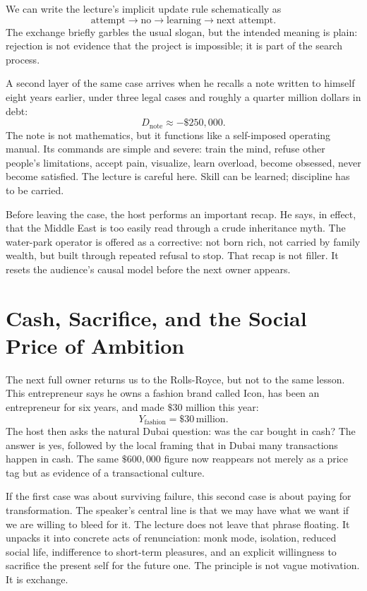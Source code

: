 We can write the lecture's implicit update rule schematically as
\begin{equation}
\text{attempt}\to \text{no}\to \text{learning}\to \text{next attempt}.
\end{equation}
The exchange briefly garbles the usual slogan, but the intended meaning is plain: rejection is not evidence that the project is impossible; it is part of the search process.

A second layer of the same case arrives when he recalls a note written to himself eight years earlier, under three legal cases and roughly a quarter million dollars in debt:
\begin{equation}
D_{\text{note}}\approx -\$250{,}000.
\end{equation}
The note is not mathematics, but it functions like a self-imposed operating manual. Its commands are simple and severe: train the mind, refuse other people's limitations, accept pain, visualize, learn overload, become obsessed, never become satisfied. The lecture is careful here. Skill can be learned; discipline has to be carried.

Before leaving the case, the host performs an important recap. He says, in effect, that the Middle East is too easily read through a crude inheritance myth. The water-park operator is offered as a corrective: not born rich, not carried by family wealth, but built through repeated refusal to stop. That recap is not filler. It resets the audience's causal model before the next owner appears.

\section{Cash, Sacrifice, and the Social Price of Ambition}

The next full owner returns us to the Rolls-Royce, but not to the same lesson. This entrepreneur says he owns a fashion brand called Icon, has been an entrepreneur for six years, and made \(\$30\) million this year:
\begin{equation}
Y_{\text{fashion}}=\$30\,\text{million}.
\end{equation}
The host then asks the natural Dubai question: was the car bought in cash? The answer is yes, followed by the local framing that in Dubai many transactions happen in cash. The same \(\$600{,}000\) figure now reappears not merely as a price tag but as evidence of a transactional culture.

If the first case was about surviving failure, this second case is about paying for transformation. The speaker's central line is that we may have what we want if we are willing to bleed for it. The lecture does not leave that phrase floating. It unpacks it into concrete acts of renunciation: monk mode, isolation, reduced social life, indifference to short-term pleasures, and an explicit willingness to sacrifice the present self for the future one. The principle is not vague motivation. It is exchange.

